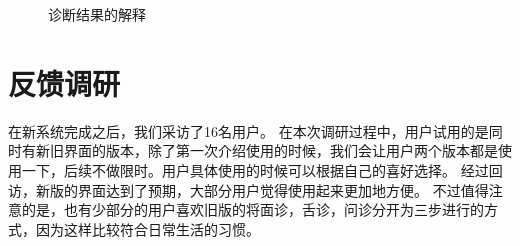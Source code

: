 \begin{figure}[ht]
    \centering
    \caption{诊断结果的解释}
    \label{fig:report_explain_phy_1}
\end{figure}


\section{反馈调研}
在新系统完成之后，我们采访了16名用户。
在本次调研过程中，用户试用的是同时有新旧界面的版本，除了第一次介绍使用的时候，我们会让用户两个版本都是使用一下，后续不做限时。用户具体使用的时候可以根据自己的喜好选择。
经过回访，新版的界面达到了预期，大部分用户觉得使用起来更加地方便。
不过值得注意的是，也有少部分的用户喜欢旧版的将面诊，舌诊，问诊分开为三步进行的方式，因为这样比较符合日常生活的习惯。
